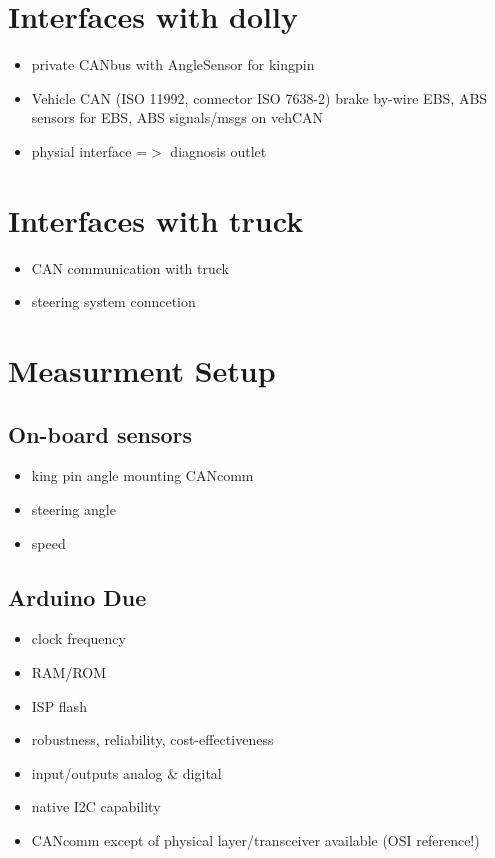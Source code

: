 \documentclass[ExampleMasters.tex]{subfiles}
\begin{document}
\section{Interfaces with dolly}
\label{sec:interface_with_dolly}

\begin{itemize}
	\item private CANbus with AngleSensor for kingpin
	\item Vehicle CAN (ISO 11992, connector ISO 7638-2)
	\subitem brake by-wire
	\subitem EBS, ABS
	\subitem sensors for EBS, ABS
	\subitem signals/msgs on vehCAN
	\item physial interface =$>$ diagnosis outlet
\end{itemize}

\section{Interfaces with truck}
\label{sec:interface_with_dolly}

\begin{itemize}
	\item CAN communication with truck
	\item steering system conncetion

\end{itemize}


\section{Measurment Setup}
\label{sec:measurement_setup}

\subsection{On-board sensors}
\begin{itemize}
	\item king pin angle
	\subitem mounting
	\subitem CANcomm
	
	\item steering angle 
	\item speed
\end{itemize}

\subsection{Arduino Due}
\label{sec:arduino}
\begin{itemize}
	\item clock frequency
	\item RAM/ROM
	\item ISP flash
	\item robustness, reliability, cost-effectiveness
	\item input/outputs analog $\&$ digital
	\item native I2C capability
	\item CANcomm except of physical layer/transceiver available (OSI reference!)
\end{itemize}
\end{document}
